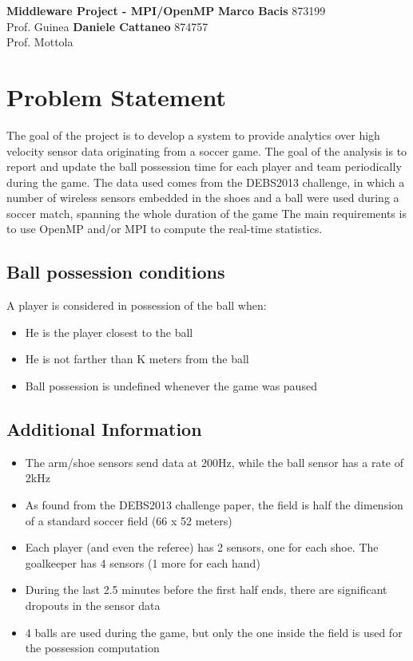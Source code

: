 \documentclass[a4paper, 10pt]{article}
\begin{document}
\noindent
\large\textbf{Middleware Project - MPI/OpenMP} \hfill \textbf{Marco Bacis} 873199 \\
Prof. Guinea \hfill \textbf{Daniele Cattaneo} 874757 \\
Prof. Mottola

\section*{Problem Statement}
The goal of the project is to develop a system to provide analytics over high velocity sensor data originating from a soccer game.
The goal of the analysis is to report and update the ball possession time for each player and team periodically during the game.
The data used comes from the DEBS2013 challenge, in which a number of wireless sensors embedded in the shoes and a ball were used during a soccer match, spanning the whole duration of the game
The main requirements is to use OpenMP and/or MPI to compute the real-time statistics.

\subsection*{Ball possession conditions}
A player is considered in possession of the ball when:
\begin{itemize}
\item He is the player closest to the ball
\item He is not farther than K meters from the ball
\item Ball possession is undefined whenever the game was paused
\end{itemize}

\subsection*{Additional Information}
\begin{itemize}
    \item The arm/shoe sensors send data at 200Hz, while the ball sensor has a rate of 2kHz
    \item As found from the DEBS2013 challenge paper, the field is half the dimension of a standard soccer field (66 x 52 meters)
    \item Each player (and even the referee) has 2 sensors, one for each shoe. The goalkeeper has 4 sensors (1 more for each hand)
    \item During the last 2.5 minutes before the first half ends, there are significant dropouts in the sensor data
    \item 4 balls are used during the game, but only the one inside the field is used for the possession computation
\end{itemize}
\end{document}
